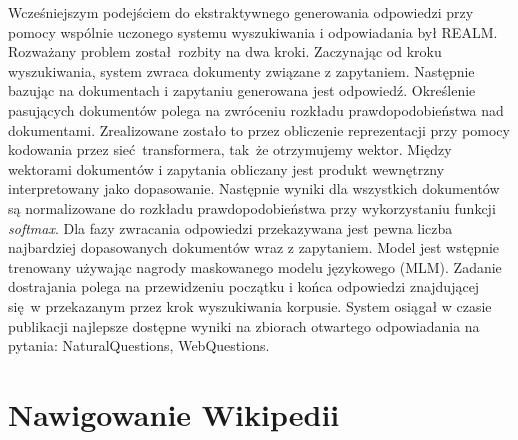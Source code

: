 Wcześniejszym podejściem do ekstraktywnego generowania odpowiedzi przy pomocy wspólnie uczonego systemu wyszukiwania i odpowiadania był REALM.  
Rozważany problem został rozbity na dwa kroki. Zaczynając od kroku wyszukiwania, system zwraca dokumenty związane z zapytaniem. Następnie bazując na dokumentach i zapytaniu generowana jest odpowiedź. Określenie pasujących dokumentów polega na zwróceniu rozkładu prawdopodobieństwa nad dokumentami. Zrealizowane zostało to przez obliczenie reprezentacji przy pomocy kodowania przez sieć transformera, tak że otrzymujemy wektor. Między wektorami dokumentów i zapytania obliczany jest produkt wewnętrzny interpretowany jako dopasowanie. Następnie wyniki dla wszystkich dokumentów są normalizowane do rozkładu prawdopodobieństwa przy wykorzystaniu funkcji \emph{softmax}. Dla fazy zwracania odpowiedzi przekazywana jest pewna liczba najbardziej dopasowanych dokumentów wraz z zapytaniem. Model jest wstępnie trenowany używając nagrody maskowanego modelu językowego (MLM). Zadanie dostrajania polega na przewidzeniu początku i końca odpowiedzi znajdującej się w przekazanym przez krok wyszukiwania korpusie. System osiągał w czasie publikacji najlepsze dostępne wyniki na zbiorach otwartego odpowiadania na pytania: NaturalQuestions,  WebQuestions. \autocite{guu2020realm}

\section{Nawigowanie Wikipedii}

